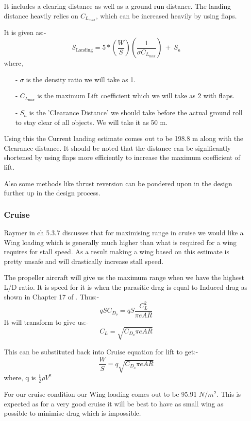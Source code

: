 \documentclass[12 pt]{article}
\begin{document}
It includes a clearing distance as well as a ground run distance. The landing distance heavily relies on $C_{L_{max}}$, which can be increased heavily by using flaps.

It is given as:- 
$$ S_{\text{Landing}} = 5*\left( \frac{W}{S} \right) \left( \frac{1}{\sigma C_{L_{\text{max}}}} \right) \: + \: S_a$$
where,
\begin{itemize}
    \item [-] $\sigma$ is the density ratio we will take as 1.
    \item[-] $C_{L_{\text{max}}} $ is the maximum Lift coefficient which we will take as 2 with flaps.
    \item[-] $S_a$ is the 'Clearance Distance' we should take before the actual ground roll to stay clear of all objects. We will take it as 50 m.
\end{itemize}

Using this the Current landing estimate comes out to be 198.8 m along with the Clearance distance. It should be noted that the distance can be significantly shortened by using flaps more efficiently to increase the maximum coefficient of lift.

Also some methods like thrust reversion can be pondered upon in the design further up in the design process.


\subsubsection{Cruise}

Raymer in \cite{Raymer.2006} ch 5.3.7 discusses that for maximising range in cruise we would like a Wing loading which is generally much higher than what is required for a wing requires for stall speed. As a result making a wing based on this estimate is pretty unsafe and will drastically increase stall speed.

The propeller aircraft will give us the maximum range when we have the highest L/D ratio. It is speed for it is when the parasitic drag is equal to Induced drag as shown in Chapter 17 of \cite{Raymer.2006}. Thus:-
$$qSC_{D_o} = qS\frac{C_L^2}{\pi e AR}$$
It will transform to give us:- 
$$ C_L = \sqrt{C_{D_o} \pi e AR }$$

This can be substituted back into Cruise equation for lift to get:-
$$ \frac{W}{S} = q \sqrt{C_{D_o} \pi e AR}$$
where, q is $\frac{1}{2} \rho V^2 $

For our cruise condition our Wing loading comes out to be 95.91 $N/m^2$. This is expected as for a very good cruise it will be best to have as small wing as possible to minimise drag which is impossible.
\end{document}

